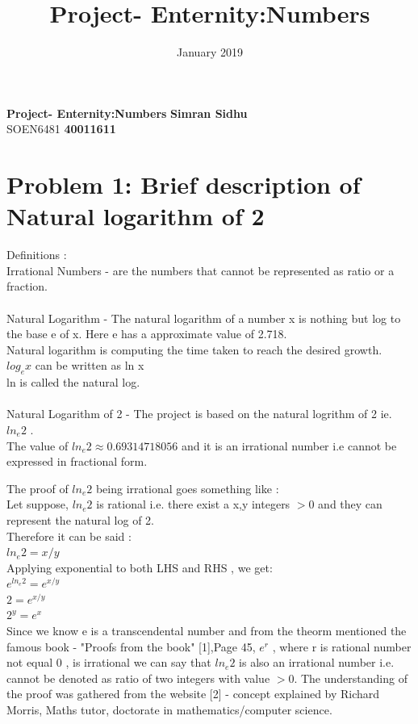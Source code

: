 \documentclass[12pt]{article}
\title{Project- Enternity:Numbers}
\date{January 2019}
\begin{document}
\noindent
\large\textbf{Project- Enternity:Numbers} \hfill \textbf{Simran Sidhu} \\
\normalsize SOEN6481 \hfill \textbf{40011611} \\
\section{Problem 1: Brief description of Natural logarithm of 2}
Definitions :\\
Irrational Numbers - are the numbers that cannot be represented as ratio or a fraction.\\\\
Natural Logarithm -  The natural logarithm of a number x is nothing but log to the base e of x. Here  e has a approximate value of 2.718.\\
Natural logarithm is computing the time taken to reach the desired growth.\\
$log_e{x}$ can be written as ln x\\
 ln is called the natural log.\\\\
Natural Logarithm of 2 - The project is based on the natural logrithm of 2 ie. $ln_e{2}$ . \\
The value of $ln_e{2} \approx 0.69314718056$ and it is an irrational number i.e cannot be expressed in fractional form.

The proof of $ln_e{2}$ being irrational goes something like :\\
Let suppose, $ln_e{2}$ is rational i.e. there exist a x,y integers  $>0$ and they can represent the natural log of 2.\\
Therefore it can be said :\\ 
$ln_e{2}=x/y$\\
Applying exponential to both LHS and RHS , we get:\\
$e^{ln_e{2}}=e^{x / y}$\\
$2=e^{x / y}$\\
$2^y=e^{x}$\\

Since we know e is a transcendental number and from the theorm mentioned the famous book - "Proofs from the book" [1],Page 45, $e^r$ , where r is rational number not equal 0 , is irrational we can say that $ln_e{2}$ is also an irrational number i.e. cannot be denoted as ratio of two integers with value $>0$. The understanding of the proof was gathered from the website [2] - concept explained by Richard Morris, Maths tutor, doctorate in mathematics/computer science.
\end{document}
